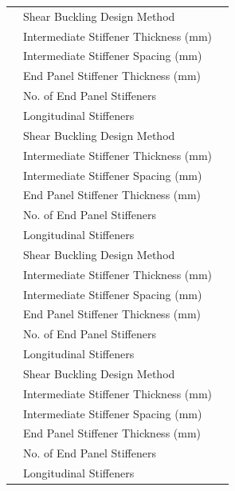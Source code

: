\documentclass[12pt,a4paper]{report}
\numberwithin{table}{chapter}
\numberwithin{figure}{chapter}
\begin{document}
\begin{longtable}{|C{2.5cm}|L{6.5cm}|>{\arraybackslash}p{6.5cm}|}
 & \textnormal{Shear Buckling Design Method} &  \\[6pt]
 & \textnormal{Intermediate Stiffener Thickness (mm)} &  \\[6pt]
 & \textnormal{Intermediate Stiffener Spacing (mm)} &  \\[6pt]
 & \textnormal{End Panel Stiffener Thickness (mm)} &  \\[6pt]
 & \textnormal{No. of End Panel Stiffeners} &  \\[6pt]
 & \textnormal{Longitudinal Stiffeners} &  \\[6pt]
\hline
{} & \textnormal{Shear Buckling Design Method} &  \\[6pt]
 & \textnormal{Intermediate Stiffener Thickness (mm)} &  \\[6pt]
 & \textnormal{Intermediate Stiffener Spacing (mm)} &  \\[6pt]
 & \textnormal{End Panel Stiffener Thickness (mm)} &  \\[6pt]
 & \textnormal{No. of End Panel Stiffeners} &  \\[6pt]
 & \textnormal{Longitudinal Stiffeners} &  \\[6pt]
\hline
{} & \textnormal{Shear Buckling Design Method} &  \\[6pt]
 & \textnormal{Intermediate Stiffener Thickness (mm)} &  \\[6pt]
 & \textnormal{Intermediate Stiffener Spacing (mm)} &  \\[6pt]
 & \textnormal{End Panel Stiffener Thickness (mm)} &  \\[6pt]
 & \textnormal{No. of End Panel Stiffeners} &  \\[6pt]
 & \textnormal{Longitudinal Stiffeners} &  \\[6pt]
\hline
{} & \textnormal{Shear Buckling Design Method} &  \\[6pt]
 & \textnormal{Intermediate Stiffener Thickness (mm)} &  \\[6pt]
 & \textnormal{Intermediate Stiffener Spacing (mm)} &  \\[6pt]
 & \textnormal{End Panel Stiffener Thickness (mm)} &  \\[6pt]
 & \textnormal{No. of End Panel Stiffeners} &  \\[6pt]
 & \textnormal{Longitudinal Stiffeners} &  \\[6pt]
\hline
\end{longtable}
\end{document}
